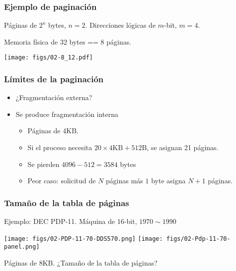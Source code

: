 \documentclass[letter]{beamer}
\begin{document}
\begin{frame}
  \frametitle{Ejemplo de paginación}

  Páginas de $2^n$ bytes, $n=2$. Direcciones lógicas de $m$-bit, $m=4$.
  
  Memoria física de 32 bytes == 8 páginas.
  
  \begin{center}
    \texttt{[image: figs/02-8\_12.pdf]}
  \end{center}

\end{frame}
\begin{frame}
  \frametitle{Límites de la paginación}

  \begin{itemize}
    \item ¿Fragmentación externa? 
    \item<2-> Se produce fragmentación interna
      \begin{itemize}
        \item Páginas de 4KB.
        \item<3-> Si el proceso necesita $20\times 4\text{KB} + 512\text{B}$,
              se asignan 21 páginas.
        \item<4-> Se pierden $4096 - 512 = 3584$ bytes
        \item<5-> Peor caso: solicitud de $N$ páginas más $1$ byte 
                  asigna $N+1$ páginas.
      \end{itemize}
  \end{itemize}
  
\end{frame}

\begin{frame}
  \frametitle{Tamaño de la tabla de páginas}

  Ejemplo: DEC PDP-11. Máquina de 16-bit, $1970\sim 1990$

  \texttt{[image: figs/02-PDP-11-70-DDS570.png]}
  \hfill
  \texttt{[image: figs/02-Pdp-11-70-panel.png]}
  
  Páginas de 8KB. ¿Tamaño de la tabla de páginas?
  
\end{frame}
\end{document}

